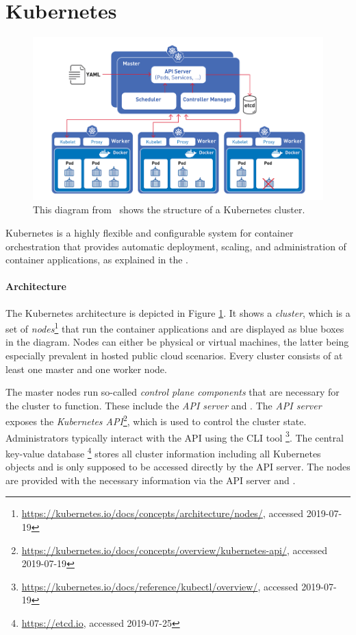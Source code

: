 \section{Kubernetes} \label{sec:bkgK8s}

\begin{figure}[H]
\begin{center}
    \includegraphics[width=0.9\linewidth]{figures/k8s_architecture.png}
    \caption[Kubernetes Architecture]{This diagram from~\textcite{k8sDiagram} shows the structure of a Kubernetes cluster.}
    \label{fig:k8sArchitecture}
\end{center}
\end{figure}


Kubernetes is a highly flexible and configurable system for container orchestration that provides automatic deployment, scaling, and administration of container applications, as explained in the \textcite{k8sdocs}. 

\paragraph{Architecture}

The Kubernetes architecture is depicted in Figure \ref{fig:k8sArchitecture}. It shows a \textit{cluster}, which is a set of \textit{nodes}\footnote{\url{https://kubernetes.io/docs/concepts/architecture/nodes/}, accessed 2019-07-19} that run the container applications and are displayed as blue boxes in the diagram. Nodes can either be physical or virtual machines, the latter being especially prevalent in hosted public cloud scenarios. Every cluster consists of at least one master and one worker node. 

The master nodes run so-called \textit{control plane components} that are necessary for the cluster to function. These include the \textit{API server} and . The \textit{API server} exposes the \textit{Kubernetes API}\footnote{\url{https://kubernetes.io/docs/concepts/overview/kubernetes-api/}, accessed 2019-07-19}, which is used to control the cluster state. Administrators typically interact with the API using the CLI tool \footnote{\url{https://kubernetes.io/docs/reference/kubectl/overview/}, accessed 2019-07-19}. The central key-value database \footnote{\url{https://etcd.io}, accessed 2019-07-25} stores all cluster information including all Kubernetes objects and is only supposed to be accessed directly by the API server. The nodes are provided with the necessary information via the API server and .

